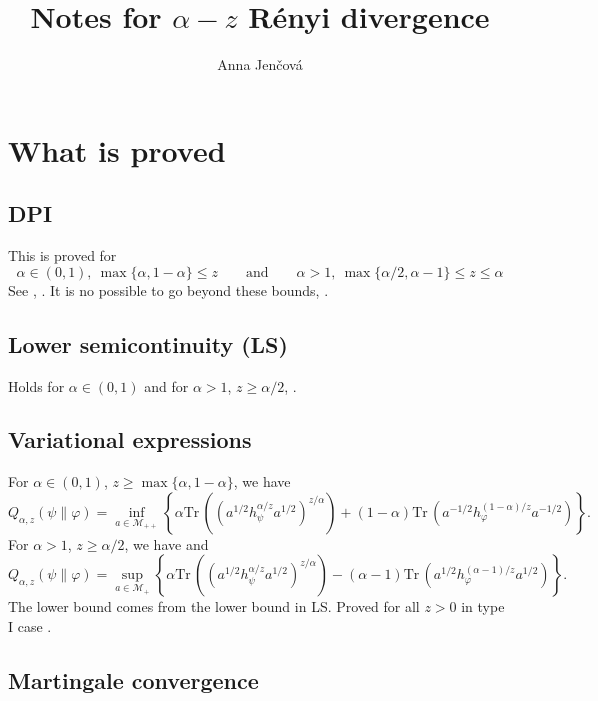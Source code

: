 \documentclass[12pt]{article}
\title{Notes for $\alpha-z$ R\'enyi divergence}
\author{Anna Jen\v cov\'a}
\theoremstyle{definition}
\theoremstyle{remark}
\def\Me{\mathcal M}
\def \Tr{\mathrm{Tr}\,}
\begin{document}
\maketitle


\section{What is proved}


\subsection{DPI}

This is proved for 
\[
\alpha\in (0,1),\ \max\{\alpha,1-\alpha\}
\le z \qquad\text{and}\qquad \alpha>1, \
\max\{\alpha/2,\alpha-1\}\le z\le \alpha
\]
See \cite[Thm. 1(viii)]{kato2023onrenyi}, \cite{AJnote}. It is no possible to go beyond these bounds,
\cite{zhang2020fromwyd}.

\subsection{Lower semicontinuity (LS)}

Holds for $\alpha\in (0,1)$ and for $\alpha>1$, $z\ge \alpha/2$, \cite{kato2023onrenyi}.


\subsection{Variational expressions}

For $\alpha\in (0,1)$, $z\ge\max\{\alpha,1-\alpha\}$, we have \cite[Theorem 1(vi)]{kato2023onrenyi}
\[
Q_{\alpha,z}(\psi\|\varphi)=\inf_{a\in \Me_{++}}\left\{\alpha\Tr
\left((a^{1/2}h_\psi^{\alpha/z}a^{1/2})^{z/\alpha}\right)+
(1-\alpha)\Tr\left(a^{-1/2}h_\varphi^{(1-\alpha)/z}a^{-1/2}\right)\right\}. 
\]
For $\alpha>1$, $z\ge \alpha/2$, we have \cite[Theorem 2(vi)]{kato2023onrenyi} and
\cite{SKnote}
\[
Q_{\alpha,z}(\psi\|\varphi)=\sup_{a\in \Me_+}\left\{\alpha\Tr
\left((a^{1/2}h_\psi^{\alpha/z}a^{1/2})^{z/\alpha}\right)-
(\alpha-1)\Tr\left(a^{1/2}h_\varphi^{(\alpha-1)/z}a^{1/2}\right)\right\}.
\]
The lower bound comes from the lower bound in LS. Proved for all $z>0$ in type I case
\cite{mosonyi2023thestrong}.

\subsection{Martingale convergence}
\end{document}
